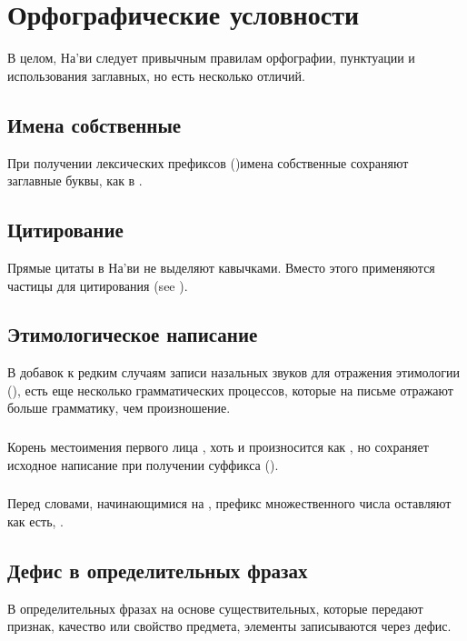 \section{Орфографические условности}
\noindent В целом, На'ви следует привычным правилам орфографии, пунктуации и использования заглавных, но есть несколько отличий.

\subsection{Имена собственные} При получении лексических префиксов
()имена собственные сохраняют заглавные буквы, как в .

\subsection{Цитирование} Прямые цитаты в На'ви не выделяют кавычками.  Вместо этого применяются частицы для цитирования
 (see ).

\subsection{Этимологическое написание} В добавок к редким случаям записи назальных звуков для отражения этимологии (),
есть еще несколько грамматических процессов, которые на письме отражают больше грамматику, чем произношение.

\subsubsection{} Корень местоимения первого лица , хоть и
произносится как , но сохраняет исходное написание при получении суффикса 
().

\subsubsection{} Перед словами, начинающимися на , префикс множественного числа
 оставляют как есть, .

\subsection{Дефис в определительных фразах} В определительных фразах на основе существительных, которые передают признак, качество или свойство предмета, элементы записываются через дефис.


